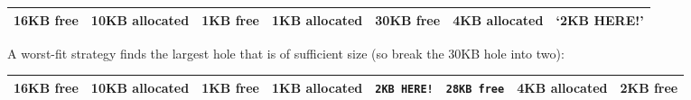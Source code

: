 \begin{longtable}[c]{@{}lllllll@{}}
\toprule
\begin{minipage}[b]{0.04\columnwidth}\raggedright\strut
16KB free
\strut\end{minipage} &
\begin{minipage}[b]{0.04\columnwidth}\raggedright\strut
10KB allocated
\strut\end{minipage} &
\begin{minipage}[b]{0.04\columnwidth}\raggedright\strut
1KB free
\strut\end{minipage} &
\begin{minipage}[b]{0.04\columnwidth}\raggedright\strut
1KB allocated
\strut\end{minipage} &
\begin{minipage}[b]{0.04\columnwidth}\raggedright\strut
30KB free
\strut\end{minipage} &
\begin{minipage}[b]{0.04\columnwidth}\raggedright\strut
4KB allocated
\strut\end{minipage} &
\begin{minipage}[b]{0.04\columnwidth}\raggedright\strut
`2KB HERE!'
\strut\end{minipage}\tabularnewline
\midrule
\endhead
\bottomrule
\end{longtable}

A worst-fit strategy finds the largest hole that is of sufficient size
(so break the 30KB hole into two):

\begin{longtable}[c]{@{}llllllll@{}}
\toprule
\begin{minipage}[b]{0.04\columnwidth}\raggedright\strut
16KB free
\strut\end{minipage} &
\begin{minipage}[b]{0.04\columnwidth}\raggedright\strut
10KB allocated
\strut\end{minipage} &
\begin{minipage}[b]{0.04\columnwidth}\raggedright\strut
1KB free
\strut\end{minipage} &
\begin{minipage}[b]{0.04\columnwidth}\raggedright\strut
1KB allocated
\strut\end{minipage} &
\begin{minipage}[b]{0.04\columnwidth}\raggedright\strut
\texttt{2KB\ HERE!}
\strut\end{minipage} &
\begin{minipage}[b]{0.04\columnwidth}\raggedright\strut
\texttt{28KB\ free}
\strut\end{minipage} &
\begin{minipage}[b]{0.04\columnwidth}\raggedright\strut
4KB allocated
\strut\end{minipage} &
\begin{minipage}[b]{0.04\columnwidth}\raggedright\strut
2KB free
\strut\end{minipage}\tabularnewline
\midrule
\endhead
\bottomrule
\end{longtable}

